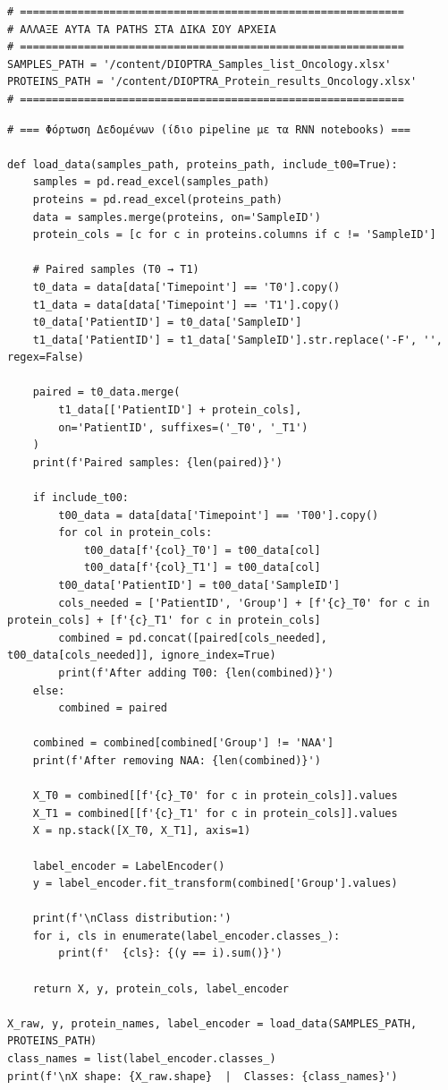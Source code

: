 \begin{lstlisting}
# ============================================================
# ΑΛΛΑΞΕ ΑΥΤΑ ΤΑ PATHS ΣΤΑ ΔΙΚΑ ΣΟΥ ΑΡΧΕΙΑ
# ============================================================
SAMPLES_PATH = '/content/DIOPTRA_Samples_list_Oncology.xlsx'
PROTEINS_PATH = '/content/DIOPTRA_Protein_results_Oncology.xlsx'
# ============================================================
\end{lstlisting}
 
\begin{lstlisting}
# === Φόρτωση Δεδομένων (ίδιο pipeline με τα RNN notebooks) ===
 
def load_data(samples_path, proteins_path, include_t00=True):
    samples = pd.read_excel(samples_path)
    proteins = pd.read_excel(proteins_path)
    data = samples.merge(proteins, on='SampleID')
    protein_cols = [c for c in proteins.columns if c != 'SampleID']
 
    # Paired samples (T0 → T1)
    t0_data = data[data['Timepoint'] == 'T0'].copy()
    t1_data = data[data['Timepoint'] == 'T1'].copy()
    t0_data['PatientID'] = t0_data['SampleID']
    t1_data['PatientID'] = t1_data['SampleID'].str.replace('-F', '', regex=False)
 
    paired = t0_data.merge(
        t1_data[['PatientID'] + protein_cols],
        on='PatientID', suffixes=('_T0', '_T1')
    )
    print(f'Paired samples: {len(paired)}')
 
    if include_t00:
        t00_data = data[data['Timepoint'] == 'T00'].copy()
        for col in protein_cols:
            t00_data[f'{col}_T0'] = t00_data[col]
            t00_data[f'{col}_T1'] = t00_data[col]
        t00_data['PatientID'] = t00_data['SampleID']
        cols_needed = ['PatientID', 'Group'] + [f'{c}_T0' for c in protein_cols] + [f'{c}_T1' for c in protein_cols]
        combined = pd.concat([paired[cols_needed], t00_data[cols_needed]], ignore_index=True)
        print(f'After adding T00: {len(combined)}')
    else:
        combined = paired
 
    combined = combined[combined['Group'] != 'NAA']
    print(f'After removing NAA: {len(combined)}')
 
    X_T0 = combined[[f'{c}_T0' for c in protein_cols]].values
    X_T1 = combined[[f'{c}_T1' for c in protein_cols]].values
    X = np.stack([X_T0, X_T1], axis=1)
 
    label_encoder = LabelEncoder()
    y = label_encoder.fit_transform(combined['Group'].values)
 
    print(f'\nClass distribution:')
    for i, cls in enumerate(label_encoder.classes_):
        print(f'  {cls}: {(y == i).sum()}')
 
    return X, y, protein_cols, label_encoder
 
X_raw, y, protein_names, label_encoder = load_data(SAMPLES_PATH, PROTEINS_PATH)
class_names = list(label_encoder.classes_)
print(f'\nX shape: {X_raw.shape}  |  Classes: {class_names}')
\end{lstlisting}
 
